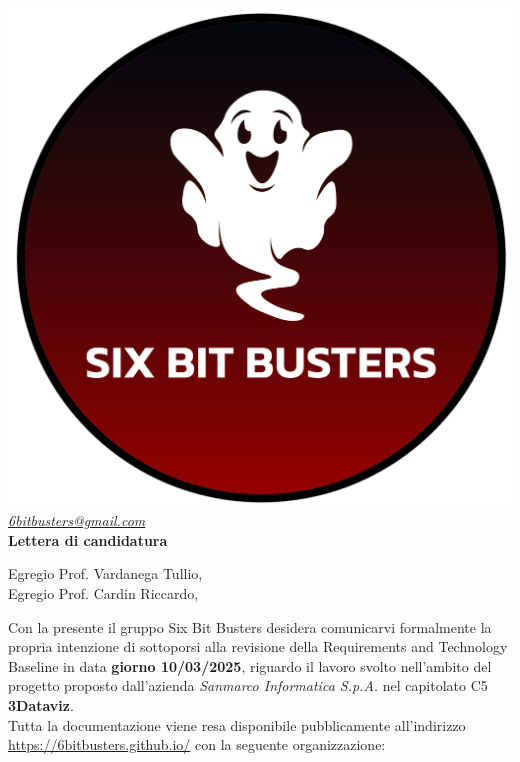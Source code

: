 \thispagestyle{empty}
\renewcommand{\arraystretch}{1.0}


\begin{titlepage}
	\begin{center}
	\includegraphics[scale = 0.5]{template/images/logo-circle.png}
	\\[1cm]
	\href{mailto:6bitbusters@gmail.com}		      	
	{\large{\textit{6bitbusters@gmail.com} } }\\[1cm]
	
	{\Huge{ \textbf{Lettera di candidatura} } }\\[1cm]
        \end{center}
        Egregio Prof. Vardanega Tullio, \\
        Egregio Prof. Cardin Riccardo,
        \newline

        Con la presente il gruppo Six Bit Busters desidera comunicarvi formalmente la propria
        intenzione di sottoporsi alla revisione della Requirements and Technology Baseline in data \textbf{giorno 10/03/2025}, riguardo il lavoro svolto nell'ambito del progetto proposto dall'azienda \textit{Sanmarco Informatica S.p.A.}
        nel capitolato C5 \textbf{3Dataviz}.\\

        Tutta la documentazione viene resa disponibile pubblicamente all'indirizzo \url{https://6bitbusters.github.io/} con la
        seguente organizzazione:


\end{titlepage}
